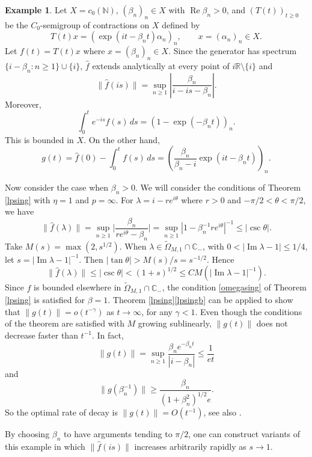 \documentclass[11pt]{amsart}
\theoremstyle{definition}
\newtheorem{example}[theorem]{Example}
\theoremstyle{remark}
\numberwithin{equation}{section}
\begin{document}
\begin{example}
Let $X=c_0({{\mathbb N}})$, $(\beta_n)_n \in X$ with ${\operatorname{Re}}\beta_n>0$, and $(T(t))_{t\ge0}$ be the $C_0$-semigroup of contractions on $X$ defined by
\[
T(t)x  =  (\exp(it-\beta_n t) \alpha_n)_n, \qquad x = (\alpha_n)_n \in X.
\]
Let $f(t) = T(t)x$ where $x = (\beta_n)_n \in X$.  Since the generator has spectrum $\{i-\beta_n : n\ge1\} \cup \{i\}$, $\widehat f$ extends analytically at every point of $i{{\mathbb R}} \setminus \{i\}$ and
\[
\big\| \widehat f(is) \big\| = \sup_{n\ge1} \left| \frac {\beta_n}{i-is-\beta_n} \right|.
\]
Moreover,
\[
\int_0^t e^{-is} f(s) \, ds = \left(1 - \exp (-\beta_n t) \right)_n.
\]
This is bounded in $X$.   On the other hand,
\[
g(t) = \widehat f(0) - \int_0^t f(s) \, ds =  \left(\frac{\beta_n}{\beta_n-i}  \exp(it-\beta_n t) \right)_n.
\]

Now consider the case when $\beta_n>0$.  We will consider the conditions of   Theorem \ref{lpsing} with $\eta=1$ and $p=\infty$.  For $\lambda = i - re^{i\theta}$ where $r>0$ and $-\pi/2 < \theta < \pi/2$, we have
\[
\big\| \widehat f(\lambda) \big\| = \sup_{n\ge1} \Big| \frac {\beta_n}{re^{i\theta}-\beta_n} \Big| = \sup_{n\ge1} |1 - \beta_n^{-1}re^{i\theta}|^{-1} \le |\csc \theta|.
\]
Take $M(s) = \max(2,s^{1/2})$.  When $\lambda \in \widetilde\Omega_{M,1} \cap {{\mathbb C}}_-$, with $0< |{\operatorname{Im}}\lambda - 1|\le 1/4$, let $s = |{\operatorname{Im}}\lambda - 1|^{-1}$.  Then $|\tan \theta| > M(s)/s = s^{-1/2}$.  Hence
$$
\big\| \widehat f(\lambda) \big\| \le  |\csc \theta| < (1+s)^{1/2} \le C M(|{\operatorname{Im}}\lambda-1|^{-1}).
$$
Since $\widehat f$ is bounded elsewhere in $\widetilde\Omega_{M,1} \cap {{\mathbb C}}_-$, the condition \eqref{omegasing} of Theorem \ref{lpsing} is satisfied for $\beta = 1$.    Theorem \ref{lpsing}\eqref{lpsingb} can be applied  to show that $\|g(t)\|= o(t^{-\gamma})$ as $t \to\infty$, for any $\gamma<1$.  Even though the conditions of the theorem are satisfied with $M$ growing sublinearly,  $\|g(t)\|$ does not decrease faster than $t^{-1}$.  In fact,
\[
\|g(t)\| = \sup_{n\ge1} \frac{\beta_n e^{-\beta_n t}} {|i - \beta_n|}  \le \frac{1}{et}
\]
and
\[
\|g(\beta_n^{-1})\| \ge \frac {\beta_n}{(1+ \beta_n^2)^{1/2}e}.
\]
So the optimal rate of decay is $\|g(t)\| = O(t^{-1})$, see also \cite[Proposition 4.3]{BaDu}.

By choosing $\beta_n$ to have arguments tending to $\pi/2$, one can construct variants of this example in which $\|\widehat f(is)\|$ increases arbitrarily rapidly as $s\to1$.
\end{example}
\end{document}
